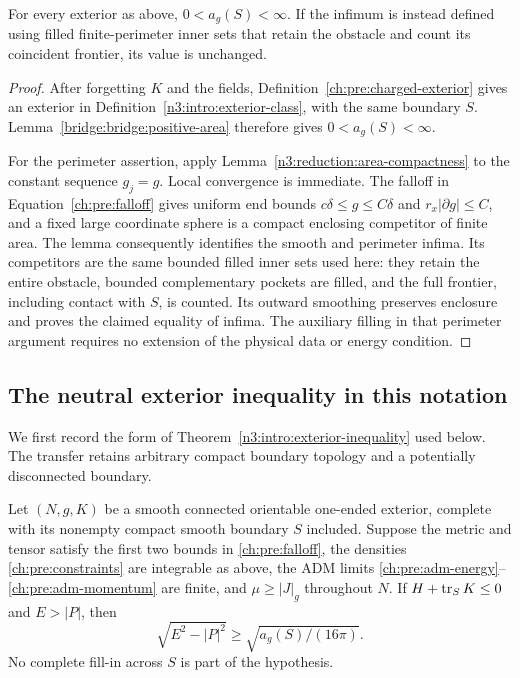 \begin{lemma}\label{ch:pre:area-positive}
For every exterior as above, $0<a_g(S)<\infty$. If the infimum is instead defined using filled finite-perimeter inner sets that retain the obstacle and count its coincident frontier, its value is unchanged.
\end{lemma}

\begin{proof}
After forgetting $K$ and the fields, Definition~\ref{ch:pre:charged-exterior}
gives an exterior in Definition~\ref{n3:intro:exterior-class}, with the
same boundary $S$. Lemma~\ref{bridge:bridge:positive-area} therefore gives
$0<a_g(S)<\infty$.

For the perimeter assertion, apply
Lemma~\ref{n3:reduction:area-compactness} to the constant sequence $g_j=g$.
Local convergence is immediate. The falloff in
Equation~\eqref{ch:pre:falloff} gives uniform end bounds
$c\delta\le g\le C\delta$ and $r_x|\partial g|\le C$, and a fixed
large coordinate sphere is a compact enclosing competitor of finite
area. The lemma consequently identifies the smooth and perimeter
infima. Its competitors are the same bounded filled inner sets used here:
they retain the entire obstacle, bounded complementary pockets are
filled, and the full frontier, including contact with $S$, is counted.
Its outward smoothing preserves enclosure and proves the claimed
equality of infima. The auxiliary filling in that perimeter argument
requires no extension of the physical data or energy condition.
\end{proof}

\subsection{The neutral exterior inequality in this notation}

We first record the form of Theorem~\ref{n3:intro:exterior-inequality} used below. The transfer retains arbitrary compact boundary topology and a potentially disconnected boundary.

\begin{proposition}
\label{ch:pre:neutral-exterior}
Let $(N,g,K)$ be a smooth connected orientable one-ended exterior, complete with its nonempty compact smooth boundary $S$ included. Suppose the metric and tensor satisfy the first two bounds in \eqref{ch:pre:falloff}, the densities \eqref{ch:pre:constraints} are integrable as above, the ADM limits \eqref{ch:pre:adm-energy}--\eqref{ch:pre:adm-momentum} are finite, and $\mu\ge|J|_g$ throughout $N$. If $H+\operatorname{tr}_SK\le0$ and $E>|P|$, then
\[
 \sqrt{E^2-|P|^2}\ge\sqrt{a_g(S)/(16\pi)}.
\]
No complete fill-in across $S$ is part of the hypothesis.
\end{proposition}

